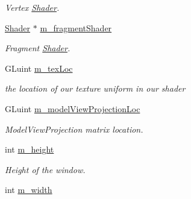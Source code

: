 \begin{DoxyCompactItemize}
\begin{DoxyCompactList}\small\item\em Vertex \hyperlink{class_shader}{Shader}. \end{DoxyCompactList}\item 
\hypertarget{class_open_g_l_widget_a33af30ba20b0f000a7cb3994cff1e5af}{\hyperlink{class_shader}{Shader} $\ast$ \hyperlink{class_open_g_l_widget_a33af30ba20b0f000a7cb3994cff1e5af}{m\-\_\-fragment\-Shader}}\label{class_open_g_l_widget_a33af30ba20b0f000a7cb3994cff1e5af}

\begin{DoxyCompactList}\small\item\em Fragment \hyperlink{class_shader}{Shader}. \end{DoxyCompactList}\item 
\hypertarget{class_open_g_l_widget_a3da576e1307d3ab9ce0d5b794a9b823b}{G\-Luint \hyperlink{class_open_g_l_widget_a3da576e1307d3ab9ce0d5b794a9b823b}{m\-\_\-tex\-Loc}}\label{class_open_g_l_widget_a3da576e1307d3ab9ce0d5b794a9b823b}

\begin{DoxyCompactList}\small\item\em the location of our texture uniform in our shader \end{DoxyCompactList}\item 
\hypertarget{class_open_g_l_widget_a539e357fecf58e13d84ebfb786d14cac}{G\-Luint \hyperlink{class_open_g_l_widget_a539e357fecf58e13d84ebfb786d14cac}{m\-\_\-model\-View\-Projection\-Loc}}\label{class_open_g_l_widget_a539e357fecf58e13d84ebfb786d14cac}

\begin{DoxyCompactList}\small\item\em Model\-View\-Projection matrix location. \end{DoxyCompactList}\item 
\hypertarget{class_open_g_l_widget_a6bb2ba6c717c60daff0b236aee665b7b}{int \hyperlink{class_open_g_l_widget_a6bb2ba6c717c60daff0b236aee665b7b}{m\-\_\-height}}\label{class_open_g_l_widget_a6bb2ba6c717c60daff0b236aee665b7b}

\begin{DoxyCompactList}\small\item\em Height of the window. \end{DoxyCompactList}\item 
\hypertarget{class_open_g_l_widget_aed67d57fb5dae34ac27f76b729735957}{int \hyperlink{class_open_g_l_widget_aed67d57fb5dae34ac27f76b729735957}{m\-\_\-width}}\label{class_open_g_l_widget_aed67d57fb5dae34ac27f76b729735957}


\end{DoxyCompactItemize}
